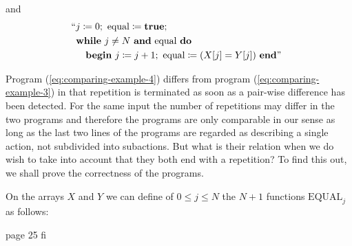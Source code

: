 \noindent
and
\begin{equation}
	\label{eq:comparing-example-4}
	\begin{split}
		&\text{\hspace{-.5em}``}j \coloneq 0;\text{ equal} \coloneq \text{\textbf{true}};\\
		&\text{\textbf{while} } j \neq N\text{ \textbf{and} equal \textbf{do}}\\
		&\quad\text{\textbf{begin} } j \coloneq  j + 1;\text{ equal} \coloneq (X[j] = Y[j]) \text{ \textbf{end}''}
	\end{split}
\end{equation}

Program (\ref{eq:comparing-example-4}) differs from program (\ref{eq:comparing-example-3}) in that repetition is terminated as soon as a pair-wise difference has been detected. For the same input the number of repetitions may differ in the two programs and therefore the programs are only comparable in our sense as long as the last two lines of the programs are regarded as describing a single action, not subdivided into subactions. But what is their relation when we do wish to take into account that they both end with a repetition? To find this out, we shall prove the correctness of the programs.

On the arrays $X$ and $Y$ we can define of $0 \leqslant j \leqslant N$ the $N + 1$ functions $\text{EQUAL}_j$ as follows:

page 25 fi